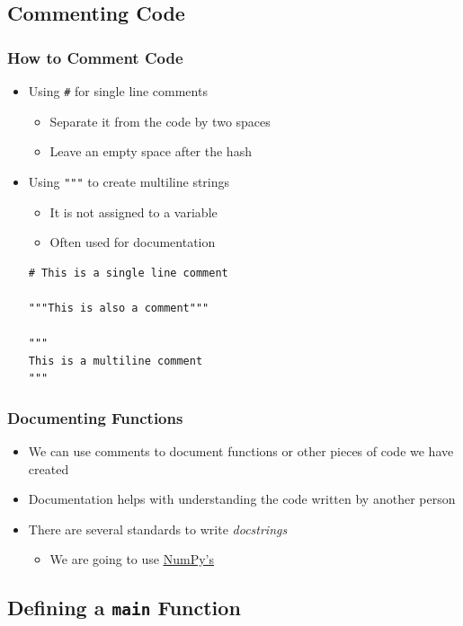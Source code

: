 \documentclass[11pt]{beamer}
\begin{document}
\subsection{Commenting Code}

\begin{frame}[fragile]\frametitle{How to Comment Code}
\begin{itemize}
\item Using \lstinline|#| for single line comments
    \begin{itemize}
    \item Separate it from the code by two spaces
    \item Leave an empty space after the hash
    \end{itemize}
\item Using \lstinline|"""| to create multiline strings
    \begin{itemize}
    \item It is not assigned to a variable
    \item Often used for documentation
    \end{itemize}
\begin{lstlisting}
# This is a single line comment

"""This is also a comment"""

"""
This is a multiline comment
"""
\end{lstlisting}
\end{itemize}
\end{frame}

\begin{frame}\frametitle{Documenting Functions}
\begin{itemize}
\item We can use comments to document functions or other pieces of code we have created
\item Documentation helps with understanding the code written by another person
\item There are several standards to write \textit{docstrings}
    \begin{itemize}
    \item We are going to use \href{https://numpydoc.readthedocs.io/en/latest/format.html}{\color{blue}\underline{NumPy's}}
    \end{itemize}
\end{itemize}
\end{frame}

\subsection{Defining a \texttt{main} Function}
\end{document}
